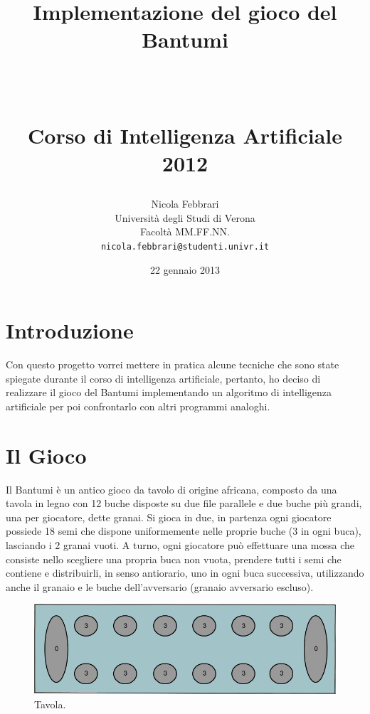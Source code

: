 \documentclass[paper=a4, fontsize=11pt]{scrartcl}	%
\title{ \vspace{-1in} 	\usefont{OT1}{bch}{b}{n}
		\huge \strut Implementazione del gioco del Bantumi \strut \\
		\Large \bfseries \strut Corso di Intelligenza Artificiale 2012 \strut
}
\author{ 									\usefont{OT1}{bch}{m}{n}
        Nicola Febbrari\\		\usefont{OT1}{bch}{m}{n}
        Universit\`a degli Studi di Verona\\	\usefont{OT1}{bch}{m}{n}
        Facolt\`a MM.FF.NN.\\
        \texttt{nicola.febbrari@studenti.univr.it}
}
\date{22 gennaio 2013}
\numberwithin{equation}{section}															%
\numberwithin{figure}{section}																%
\numberwithin{table}{section}																%
\begin{document}
\maketitle
\section{Introduzione}
Con questo progetto vorrei mettere in pratica alcune  tecniche che sono state spiegate durante il corso di intelligenza artificiale, pertanto, ho deciso di realizzare il gioco del Bantumi implementando un algoritmo di intelligenza artificiale per poi confrontarlo con altri programmi analoghi.

\section{Il Gioco}
Il Bantumi \`e un antico gioco da tavolo di origine africana, composto da una tavola in legno con 12 buche disposte su due file parallele e due buche pi\`u grandi, una per giocatore, dette granai.
Si gioca in due, in partenza ogni giocatore possiede 18 semi che dispone uniformemente nelle proprie buche (3 in ogni buca), lasciando i 2 granai vuoti.
A turno, ogni giocatore pu\`o effettuare una mossa che consiste nello scegliere una propria buca non vuota, prendere tutti i semi che contiene e distribuirli, in senso antiorario, uno in ogni buca successiva, utilizzando anche il granaio e le buche dell'avversario (granaio avversario escluso).



\begin{figure}[h]
\centering
        \includegraphics[totalheight=4.4cm]{Bantumi.png}
    \caption{Tavola.}
    \label{fig:verticalcell}
\end{figure}
\end{document}
